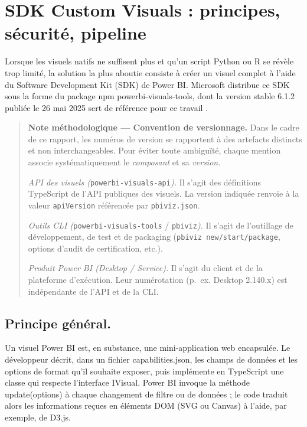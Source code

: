 \section{SDK Custom Visuals : principes, sécurité, pipeline}
\label{sec:sdk}

Lorsque les visuels natifs ne suffisent plus et qu’un script Python ou R se révèle trop limité, la solution la plus aboutie consiste à créer un visuel complet à l’aide du Software Development Kit (SDK) de Power BI. Microsoft distribue ce SDK sous la forme du package npm powerbi-visuals-tools, dont la version stable 6.1.2 publiée le 26 mai 2025 sert de référence pour ce travail \parencite{MicrosoftSDKNpm2025}.  

\begin{quote}\small
\textbf{Note méthodologique — Convention de versionnage.}
Dans le cadre de ce rapport, les numéros de version se rapportent à des artefacts distincts et non interchangeables. Pour éviter toute ambiguïté, chaque mention associe systématiquement le \emph{composant} et sa \emph{version}.

\textit{API des visuels (}\texttt{powerbi-visuals-api}\textit{).} Il s'agit des définitions TypeScript de l'API publiques des visuels. La version indiquée renvoie à la valeur \texttt{apiVersion} référencée par \texttt{pbiviz.json}. %

\textit{Outils CLI (}\texttt{powerbi-visuals-tools} / \texttt{pbiviz}\textit{).} Il s'agit de l'outillage de développement, de test et de packaging (\texttt{pbiviz new/start/package}, options d'audit de certification, etc.). %

\textit{Produit Power BI (Desktop / Service).} Il s'agit du client et de la plateforme d'exécution. Leur numérotation (p.~ex. Desktop 2.140.x) est indépendante de l'API et de la CLI.

\label{rule:versioning}
\end{quote}


\subsection{Principe général.} Un visuel Power BI est, en substance, une mini-application web encapsulée. Le développeur décrit, dans un fichier capabilities.json, les champs de données et les options de format qu’il souhaite exposer, puis implémente en TypeScript une classe qui respecte l’interface IVisual. Power BI invoque la méthode update(options) à chaque changement de filtre ou de données ; le code traduit alors les informations reçues en éléments DOM (SVG ou Canvas) à l’aide, par exemple, de D3.js.  

